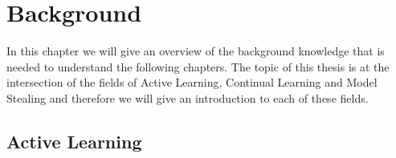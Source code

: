
\chapter{Background}
\label{ch:Background}

In this chapter we will give an overview of the background knowledge that is needed to understand the following chapters. The topic
of this thesis is at the intersection of the fields of Active Learning, Continual Learning and Model Stealing and therefore we will
give an introduction to each of these fields. 

\section{Active Learning}
\label{sec:ActiveLearning}

